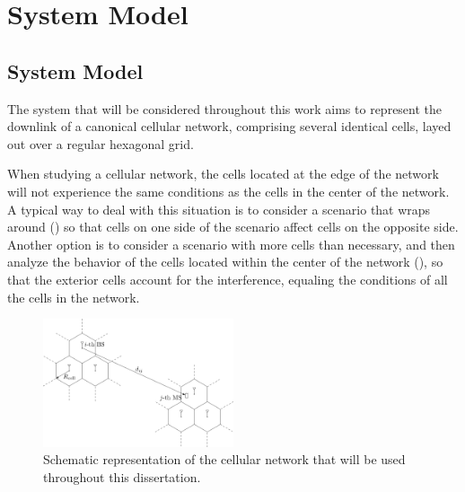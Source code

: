 \chapter{System Model}\label{ch:system_model}

\section{System Model}\label{sec:system_model}
The system that will be considered throughout this work aims to represent the
downlink of a canonical cellular network, comprising several identical cells,
layed out over a regular hexagonal grid.

When studying a cellular network, the cells located at the edge of the network
will not experience the same conditions as the cells in the center of the
network. A typical way to deal with this situation is to consider a scenario
that wraps around () so that cells on one side of the
scenario affect cells on the opposite side. Another option is to consider a
scenario with more cells than necessary, and then analyze the behavior of the
cells located within the center of the network
(), so that the exterior cells account for the
interference, equaling the conditions of all the cells in the network.

\begin{figure}[t]
   \centering
   \includegraphics[width=0.5\textwidth]{./03.system_model/img/cellular_layout}
   \caption{Schematic representation of the cellular network that will be used
       throughout this dissertation.}
   \label{fig:gen_cellular_layout}
\end{figure}

